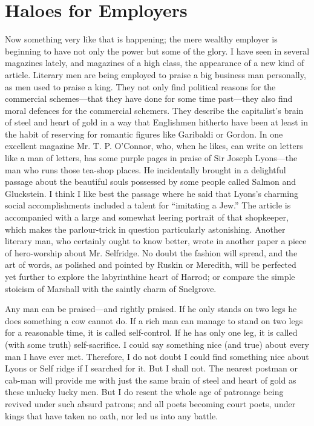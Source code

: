 \documentclass{book}
\begin{document}
\section{Haloes for Employers}
Now something very like that is happening; the mere wealthy employer is beginning to have not only the power but some of the glory. I have seen in several magazines lately, and magazines of a high class, the appearance of a new kind of article. Literary men are being employed to praise a big business man personally, as men used to praise a king. They not only find political reasons for the commercial schemes—that they have done for some time past—they also find moral defences for the commercial schemers. They describe the capitalist’s brain of steel and heart of gold in a way that Englishmen hitherto have been at least in the habit of reserving for romantic figures like Garibaldi or Gordon. In one excellent magazine Mr. T. P. O’Connor, who, when he likes, can write on letters like a man of letters, has some purple pages in praise of Sir Joseph Lyons—the man who runs those tea-shop places. He incidentally brought in a delightful passage about the beautiful souls possessed by some people called Salmon and Gluckstein. I think I like best the passage where he said that Lyons’s charming social accomplishments included a talent for “imitating a Jew.” The article is accompanied with a large and somewhat leering portrait of that shopkeeper, which makes the parlour-trick in question particularly astonishing. Another literary man, who certainly ought to know better, wrote in another paper a piece of hero-worship about Mr. Selfridge. No doubt the fashion will spread, and the art of words, as polished and pointed by Ruskin or Meredith, will be perfected yet further to explore the labyrinthine heart of Harrod; or compare the simple stoicism of Marshall with the saintly charm of Snelgrove.

Any man can be praised—and rightly praised. If he only stands on two legs he does something a cow cannot do. If a rich man can manage to stand on two legs for a reasonable time, it is called self-control. If he has only one leg, it is called (with some truth) self-sacrifice. I could say something nice (and true) about every man I have ever met. Therefore, I do not doubt I could find something nice about Lyons or Self ridge if I searched for it. But I shall not. The nearest postman or cab-man will provide me with just the same brain of steel and heart of gold as these unlucky lucky men. But I do resent the whole age of patronage being revived under such absurd patrons; and all poets becoming court poets, under kings that have taken no oath, nor led us into any battle.
\end{document}
